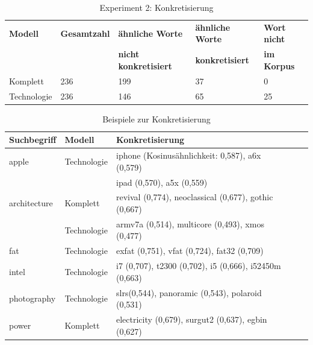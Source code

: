 \documentclass[12pt,a4paper]{report}
\begin{document}
\begin{table}[H]
\caption{Experiment 2: Konkretisierung}
\begin{center}
\begin{tabular}{|l||l|l|l|l|}
\hline
\textbf{Modell} & \textbf{Gesamtzahl}& \textbf{ähnliche Worte} & \textbf{ähnliche Worte}  & \textbf{Wort nicht}  \\
 & &\textbf{nicht konkretisiert} & \textbf{konkretisiert} & \textbf{im Korpus} \\

\hline
 Komplett & 236 & 199 & 37 & 0 \\
 \hline
 Technologie & 236 & 146 & 65 & 25 \\
 \hline
 
\end{tabular}
\end{center}
\end{table}
		
		

\begin{table}[H]
\caption{Beispiele zur Konkretisierung}
\label{tab:BspKonkretisierung}
\begin{center}
\begin{tabular}{|l||l|l|l|l|}
\hline
\textbf{Suchbegriff} & \textbf{Modell} & \textbf{Konkretisierung}   \\

\hline
 apple & Technologie & iphone (Kosinusähnlichkeit: 0,587), a6x (0,579)\\
 & & ipad (0,570), a5x (0,559)\\
 \hline
 architecture	   & Komplett & revival (0,774), neoclassical (0,677), gothic (0,667) \\
 & Technologie& armv7a (0,514), multicore (0,493), xmos (0,477) \\
\hline
 fat	& Technologie	& exfat (0,751), vfat (0,724), fat32 (0,709)	\\
 	\hline
 intel	 & Technologie& i7 (0,707), t2300 (0,702), i5 (0,666), i52450m (0,663) \\
 \hline
 photography	& Technologie& slrs(0,544), panoramic (0,543), polaroid (0,531)\\
 	\hline
 power	&	Komplett &	electricity (0,679), surgut2 (0,637), egbin (0,627) \\
 	\hline
 
\end{tabular}
\end{center}
\end{table}
		
\end{document}
